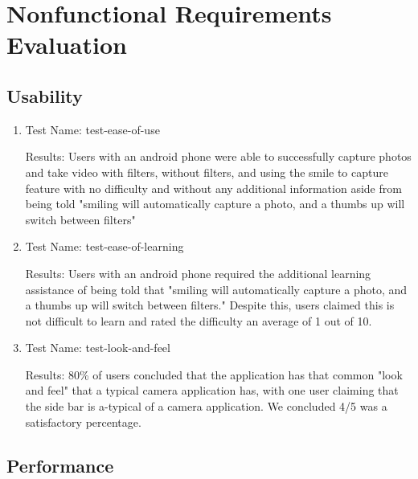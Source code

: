\documentclass[12pt, titlepage]{article}
\begin{document}
\section{Nonfunctional Requirements Evaluation}

\subsection{Usability}
\begin{enumerate}
    \item{Test Name: test-ease-of-use}
    
    Results: Users with an android phone were able to successfully capture photos and take video with filters, without filters, and using the smile to capture feature with no difficulty and without any additional information aside from being told "smiling will automatically capture a photo, and a thumbs up will switch between filters"
    
    \item{Test Name: test-ease-of-learning}
    
    Results: Users with an android phone required the additional learning assistance of being told that "smiling will automatically capture a photo, and a thumbs up will switch between filters." Despite this, users claimed this is not difficult to learn and rated the difficulty an average of 1 out of 10.
    
    \item{Test Name: test-look-and-feel}
    
    Results: 80\% of users concluded that the application has that common "look and feel" that a typical camera application has, with one user claiming that the side bar is a-typical of a camera application. We concluded 4/5 was a satisfactory percentage.  
\end{enumerate}
		
\subsection{Performance}
\end{document}
